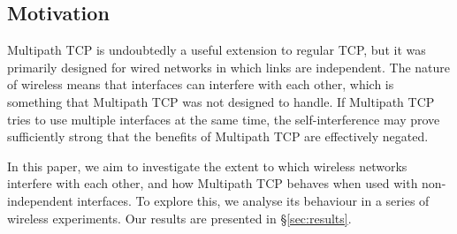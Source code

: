 \subsection{Motivation}
\label{sec:bg:motivation}
Multipath TCP is undoubtedly a useful extension to regular TCP, but it was
primarily designed for wired networks in which links are independent.
The nature of wireless means that interfaces can interfere with each
other, which is something that Multipath TCP was not designed to handle.
If Multipath TCP
tries to use multiple interfaces at the same time, the self-interference may
prove sufficiently strong that the benefits of Multipath TCP are effectively
negated.

In this paper, we aim to investigate the extent to which wireless networks
interfere with each other, and how Multipath TCP behaves when used with
non-independent interfaces. To explore this, we analyse its behaviour in a
series of wireless experiments. Our results are presented in
\S\ref{sec:results}.

